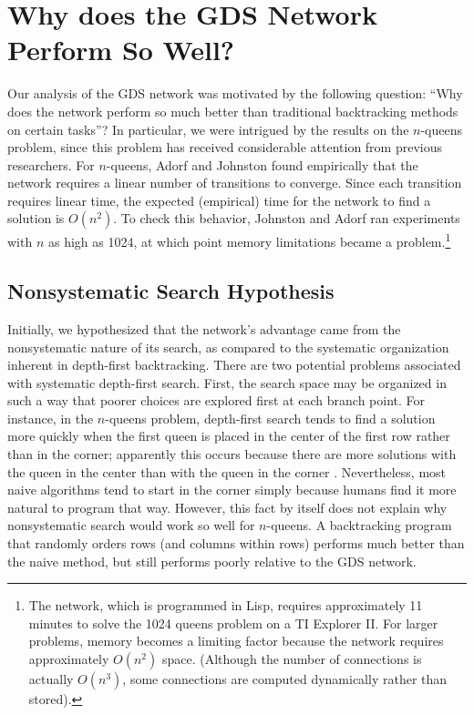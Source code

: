 \documentclass[twoside,12pt,titlepage,a4paper]{article}
\begin{document}
\section{Why does the GDS Network Perform So Well?}
\label{mv-heuristic}

Our analysis of the GDS network was motivated by the following question:
``Why does the network perform so much better than traditional backtracking
methods on certain tasks''? In particular, we were intrigued by the results
on the $n$-queens problem, since this problem has received considerable
attention from previous researchers.  For $n$-queens, Adorf and Johnston
found empirically that the network requires a linear number of transitions to
converge. Since each transition requires linear time, the expected
(empirical) time for the network to find a solution is $O(n^2)$. To check
this behavior, Johnston and Adorf ran experiments with $n$ as high as 1024,
at which point memory limitations became a problem.\footnote{The network,
which is programmed in Lisp, requires approximately 11 minutes to solve the
1024 queens problem on a TI Explorer II. For larger problems, memory becomes
a limiting factor because the network requires approximately $O(n^{2})$
space.  (Although the number of connections is actually $O(n^{3})$, some
connections are computed dynamically rather than stored).}


\vspace*{-0.05in}
\subsection{Nonsystematic Search Hypothesis}
\vspace*{-0.05in}

Initially, we hypothesized that the network's advantage came from the
nonsystematic nature of its search, as compared to the systematic
organization inherent in depth-first backtracking. There are two
potential problems associated with systematic depth-first search.
First, the search space may be organized in such a way that poorer
choices are explored first at each branch point.  For instance, in the
$n$-queens problem, depth-first search tends to find a solution more
quickly when the first queen is placed in the center of the first row
rather than in the corner; apparently this occurs because
there are more solutions with the
queen in the center than with the queen in the corner \cite{stones}.
Nevertheless,
most naive algorithms tend to start in the corner simply because
humans find it more natural to program that way.  However, this fact
by itself does not explain why nonsystematic search would work so well
for $n$-queens.  A backtracking program that randomly orders rows (and
columns within rows) performs much better than the naive method, but
still performs poorly relative to the GDS network.
\end{document}
